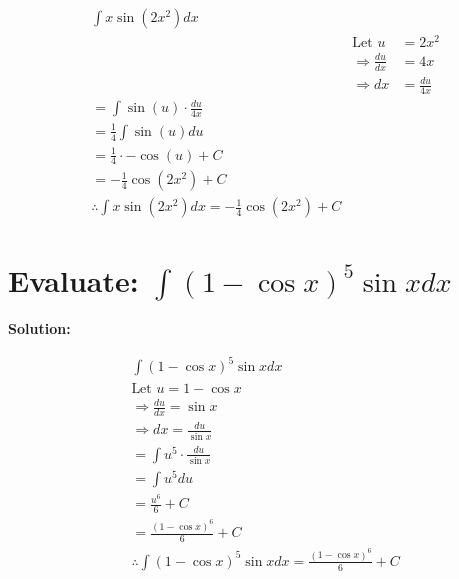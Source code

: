 \documentclass{article}
\begin{document}
\begin{align*}
     & \int x \sin(2x^2) dx                                                                                        \\
     &                                                               & \text{Let } u             & = 2x^2          \\
     &                                                               & \Rightarrow \frac{du}{dx} & = 4x            \\
     &                                                               & \Rightarrow dx            & = \frac{du}{4x} \\
     & = \int \sin(u) \cdot \frac{du}{4x}                                                                          \\
     & = \frac{1}{4} \int \sin(u) du                                                                               \\
     & = \frac{1}{4} \cdot -\cos(u) + C                                                                            \\
     & = -\frac{1}{4} \cos(2x^2) + C                                                                               \\
     & \therefore \int x \sin(2x^2) dx = -\frac{1}{4} \cos(2x^2) + C
\end{align*}

\newpage
\section{Evaluate: $\int (1-\cos x)^5 \sin x dx$}

\textbf{Solution:}

\begin{align*}
     & \int (1-\cos x)^5 \sin x dx                                         \\
     & \text{Let } u = 1-\cos x                                            \\
     & \Rightarrow \frac{du}{dx} = \sin x                                  \\
     & \Rightarrow dx = \frac{du}{\sin x}                                  \\
     & = \int u^5 \cdot \frac{du}{\sin x}                                  \\
     & = \int u^5 du                                                       \\
     & = \frac{u^6}{6} + C                                                 \\
     & = \frac{(1-\cos x)^6}{6} + C                                        \\
     & \therefore \int (1-\cos x)^5 \sin x dx = \frac{(1-\cos x)^6}{6} + C
\end{align*}
\end{document}
